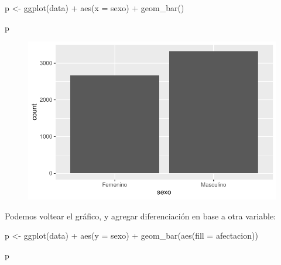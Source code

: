 \documentclass[
  letterpaper,
  DIV=11,
  numbers=noendperiod]{scrartcl}
\newenvironment{Shaded}{\begin{snugshade}}{\end{snugshade}}
\newcommand{\AttributeTok}[1]{\textcolor[rgb]{0.40,0.45,0.13}{#1}}
\newcommand{\FunctionTok}[1]{\textcolor[rgb]{0.28,0.35,0.67}{#1}}
\newcommand{\NormalTok}[1]{\textcolor[rgb]{0.00,0.23,0.31}{#1}}
\newcommand{\OtherTok}[1]{\textcolor[rgb]{0.00,0.23,0.31}{#1}}
\newcommand{\SpecialCharTok}[1]{\textcolor[rgb]{0.37,0.37,0.37}{#1}}
\begin{document}
\begin{Shaded}
\begin{Highlighting}[]
\NormalTok{p }\OtherTok{\textless{}{-}} \FunctionTok{ggplot}\NormalTok{(data) }\SpecialCharTok{+} \FunctionTok{aes}\NormalTok{(}\AttributeTok{x =}\NormalTok{ sexo) }\SpecialCharTok{+} \FunctionTok{geom\_bar}\NormalTok{()}

\NormalTok{p}
\end{Highlighting}
\end{Shaded}

\begin{figure}[H]

{\centering \includegraphics{notebook_visualization_files/figure-pdf/unnamed-chunk-3-1.pdf}

}

\end{figure}

Podemos voltear el gráfico, y agregar diferenciación en base a otra
variable:

\begin{Shaded}
\begin{Highlighting}[]
\NormalTok{p }\OtherTok{\textless{}{-}} \FunctionTok{ggplot}\NormalTok{(data) }\SpecialCharTok{+} \FunctionTok{aes}\NormalTok{(}\AttributeTok{y =}\NormalTok{ sexo) }\SpecialCharTok{+} \FunctionTok{geom\_bar}\NormalTok{(}\FunctionTok{aes}\NormalTok{(}\AttributeTok{fill =}\NormalTok{ afectacion))}

\NormalTok{p}
\end{Highlighting}
\end{Shaded}
\end{document}
